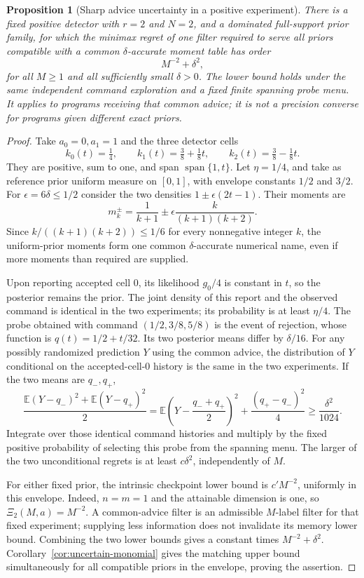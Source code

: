 \documentclass[11pt]{amsart}
\newtheorem{proposition}[theorem]{Proposition}
\theoremstyle{definition}\newtheorem{definition}[theorem]{Definition}
\theoremstyle{remark}\newtheorem{remark}[theorem]{Remark}
\newcommand{\E}{\mathbb E}\newcommand{\Prob}{\mathbb P}
\begin{document}
\begin{proposition}[Sharp advice uncertainty in a positive experiment]
\label{prop:advice-floor}
There is a fixed positive detector with $r=2$ and $N=2$, and a dominated
full-support prior family, for which the minimax regret of one filter
required to serve all priors compatible with a common $\delta$-accurate
moment table has order
\[
 M^{-2}+\delta^2,
\]
for all $M\ge1$ and all sufficiently small $\delta>0$. The lower bound
holds under the same independent command exploration and a fixed finite
spanning probe menu. It applies to programs receiving that common advice;
it is not a precision converse for programs given different exact priors.
\end{proposition}
\begin{proof}
Take $a_0=0,a_1=1$ and the three detector cells
\[
 k_0(t)=\tfrac14,\qquad k_1(t)=\tfrac38+\tfrac18t,
 \qquad k_2(t)=\tfrac38-\tfrac18t.
\]
They are positive, sum to one, and span $\operatorname{span}\{1,t\}$.
Let $\eta=1/4$, and take as reference prior uniform measure on $[0,1]$,
with envelope constants $1/2$ and $3/2$. For
$\epsilon=6\delta\le1/2$ consider the two densities
$1\pm\epsilon(2t-1)$. Their moments are
\[
 m_k^\pm=\frac1{k+1}\pm\epsilon\frac{k}{(k+1)(k+2)}.
\]
Since $k/((k+1)(k+2))\le1/6$ for every nonnegative integer $k$,
the uniform-prior moments form one common $\delta$-accurate numerical
name, even if more moments than required are supplied.

Upon reporting accepted cell $0$, its likelihood $g_0/4$ is constant
in $t$, so the posterior remains the prior. The joint density of this
report and the observed command is identical in the two experiments;
its probability is at least $\eta/4$. The probe obtained with command
$(1/2,3/8,5/8)$ is the event of rejection, whose function is
$q(t)=1/2+t/32$. Its two posterior means differ by $\delta/16$.
For any possibly randomized prediction $Y$ using the common advice,
the distribution of $Y$ conditional on the accepted-cell-$0$ history
is the same in the two experiments. If the two means are $q_-,q_+$,
\[
 \frac{\E(Y-q_-)^2+\E(Y-q_+)^2}{2}
 =\E\left(Y-\frac{q_-+q_+}{2}\right)^2
       +\frac{(q_+-q_-)^2}{4}
 \ge\frac{\delta^2}{1024}.
\]
Integrate over those identical command histories and multiply by the
fixed positive probability of selecting this probe from the spanning
menu. The larger of the two unconditional regrets is at least
$c\delta^2$, independently of $M$.

For either fixed prior, the intrinsic checkpoint lower bound is
$c'M^{-2}$, uniformly in this envelope. Indeed, $n=m=1$ and the
attainable dimension is one, so $\Xi_2(M,a)=M^{-2}$.
A common-advice filter is an admissible $M$-label filter for that fixed
experiment; supplying less information does not invalidate its memory
lower bound. Combining the two lower bounds gives a constant times
$M^{-2}+\delta^2$. Corollary~\ref{cor:uncertain-monomial} gives the
matching upper bound simultaneously for all compatible priors in the
envelope, proving the assertion.
\end{proof}
\end{document}

